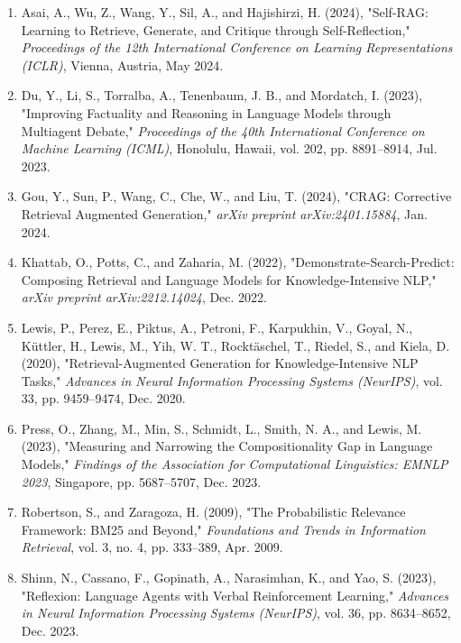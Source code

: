\documentclass[12pt,a4paper]{report}
\begin{document}
\begin{singlespace}
\noindent
\begin{enumerate}
\setlength{\itemsep}{1em}

\item Asai, A., Wu, Z., Wang, Y., Sil, A., and Hajishirzi, H. (2024), "Self-RAG: Learning to Retrieve, Generate, and Critique through Self-Reflection," \textit{Proceedings of the 12th International Conference on Learning Representations (ICLR)}, Vienna, Austria, May 2024.

\item Du, Y., Li, S., Torralba, A., Tenenbaum, J. B., and Mordatch, I. (2023), "Improving Factuality and Reasoning in Language Models through Multiagent Debate," \textit{Proceedings of the 40th International Conference on Machine Learning (ICML)}, Honolulu, Hawaii, vol. 202, pp. 8891--8914, Jul. 2023.

\item Gou, Y., Sun, P., Wang, C., Che, W., and Liu, T. (2024), "CRAG: Corrective Retrieval Augmented Generation," \textit{arXiv preprint arXiv:2401.15884}, Jan. 2024.

\item Khattab, O., Potts, C., and Zaharia, M. (2022), "Demonstrate-Search-Predict: Composing Retrieval and Language Models for Knowledge-Intensive NLP," \textit{arXiv preprint arXiv:2212.14024}, Dec. 2022.

\item Lewis, P., Perez, E., Piktus, A., Petroni, F., Karpukhin, V., Goyal, N., K\"{u}ttler, H., Lewis, M., Yih, W. T., Rockt\"{a}schel, T., Riedel, S., and Kiela, D. (2020), "Retrieval-Augmented Generation for Knowledge-Intensive NLP Tasks," \textit{Advances in Neural Information Processing Systems (NeurIPS)}, vol. 33, pp. 9459--9474, Dec. 2020.

\item Press, O., Zhang, M., Min, S., Schmidt, L., Smith, N. A., and Lewis, M. (2023), "Measuring and Narrowing the Compositionality Gap in Language Models," \textit{Findings of the Association for Computational Linguistics: EMNLP 2023}, Singapore, pp. 5687--5707, Dec. 2023.

\item Robertson, S., and Zaragoza, H. (2009), "The Probabilistic Relevance Framework: BM25 and Beyond," \textit{Foundations and Trends in Information Retrieval}, vol. 3, no. 4, pp. 333--389, Apr. 2009.

\item Shinn, N., Cassano, F., Gopinath, A., Narasimhan, K., and Yao, S. (2023), "Reflexion: Language Agents with Verbal Reinforcement Learning," \textit{Advances in Neural Information Processing Systems (NeurIPS)}, vol. 36, pp. 8634--8652, Dec. 2023.


\end{enumerate}
\end{singlespace}
\end{document}
